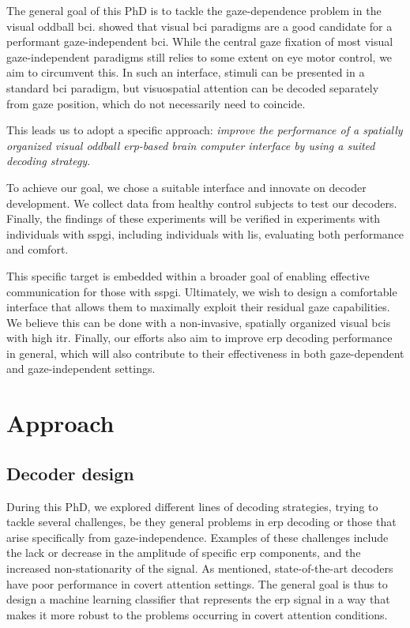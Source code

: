 The general goal of this PhD is to tackle the gaze-dependence problem in the
visual oddball \ac{bci}.
 showed that visual \ac{bci} paradigms are a
good candidate for a performant gaze-independent \ac{bci}.
While the central gaze fixation of most visual gaze-independent paradigms still
relies to some extent on eye motor control, we aim to circumvent this.
In such an interface, stimuli can be presented in a standard \ac{bci} paradigm, but
visuospatial attention can be decoded separately from gaze position, which do not necessarily need to coincide.

This leads us to adopt a specific approach: \emph{improve the performance of a
spatially organized visual oddball \ac{erp}-based brain
computer interface by using a suited decoding strategy}.

To achieve our goal, we chose a suitable interface and innovate on decoder
development.
We collect data from healthy control subjects to test our decoders.
Finally, the findings of these experiments will be verified in experiments with
individuals with \ac{sspgi}, including individuals with \ac{lis}, evaluating
both performance and comfort.

This specific target is embedded within a broader goal of enabling
effective communication for those with \ac{sspgi}.
Ultimately, we wish to design a comfortable interface that allows them to maximally exploit
their residual gaze capabilities.
We believe this can be done with a non-invasive, spatially
organized visual \acp{bci} with high \ac{itr}.
Finally, our efforts also aim to improve \ac{erp} decoding performance
in general, which will also contribute to their effectiveness in both gaze-dependent
and gaze-independent settings.


\section{Approach}

\subsection{Decoder design}

During this PhD, we explored different lines of decoding strategies,
trying to tackle several challenges, be they general problems in \ac{erp} decoding
or those that arise specifically from gaze-independence.
Examples of these challenges include the lack or decrease in the amplitude of specific \ac{erp} components, and the increased
non-stationarity of the signal.
As mentioned, state-of-the-art decoders have poor performance in covert attention
settings.
The general goal is thus to design a machine learning classifier that represents
the \ac{erp} signal in a way that makes it more robust to the problems
occurring in covert attention conditions.

